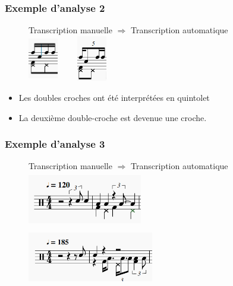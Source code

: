 \subsubsection{Exemple d’analyse 2}
\begin{figure}[h]
\centering
\tab Transcription manuelle $\Rightarrow$ Transcription automatique\\
\includegraphics[height=20mm, width=13mm]{
z_images/4_experimentations/1_analyses/0_drummer1_session3/5_manuelle.png}
\ \ \ \ 
\includegraphics[height=20mm, width=13mm]{
z_images/4_experimentations/1_analyses/0_drummer1_session3/4_musescore.png}
\end{figure}
\begin{itemize}
	\item Les doubles croches ont été interprétées en quintolet
	\item La deuxième double-croche est devenue une croche.
\end{itemize}

\subsubsection{Exemple d’analyse 3}
\begin{figure}[h]
\centering
Transcription manuelle $\Rightarrow$ Transcription automatique
\includegraphics[height=24mm, width=50mm]{
z_images/4_experimentations/1_analyses/0_drummer1_session3/3_manuelle.png}
\ \ \ \ 
\includegraphics[height=25mm, width=55mm]{
z_images/4_experimentations/1_analyses/0_drummer1_session3/2_musescore.png}
\end{figure}


